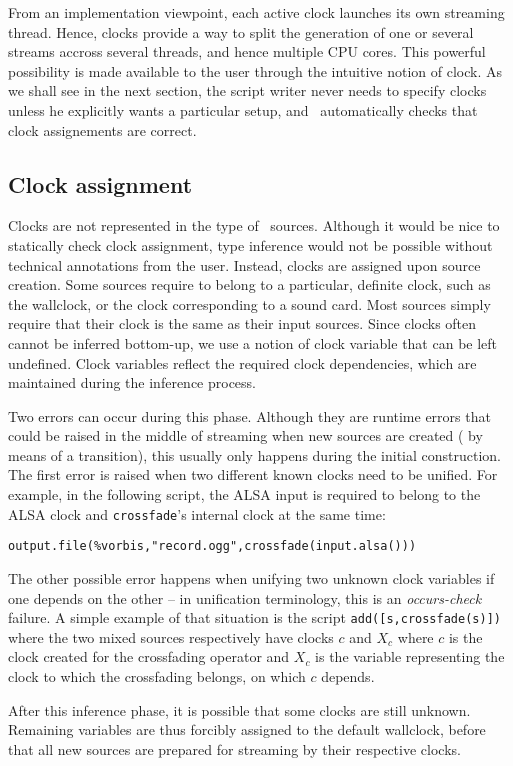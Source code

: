 From an implementation viewpoint, each active clock launches
its own streaming thread.
Hence, clocks provide a way to split the generation of one or
several streams accross several threads,
and hence multiple CPU cores.
This powerful possibility is made available to the user
through the intuitive notion of clock.
As we shall see in the next section,
the script writer never needs to specify clocks unless he
explicitly wants a particular setup,
and \liquidsoap\ automatically checks that clock assignements
are correct.


\subsection{Clock assignment}

Clocks are not represented in the type of \liquidsoap\ sources.
Although it would be nice to statically check clock assignment,
type inference would not be possible without technical annotations
from the user. Instead, clocks are assigned upon source creation.
Some sources require to belong to a particular, definite clock,
such as the wallclock, or the clock corresponding to a sound card.
Most sources simply require that their clock is the same as their
input sources.
Since clocks often cannot be inferred bottom-up, we use a notion
of clock variable that can be left undefined.
Clock variables reflect the required clock dependencies,
which are maintained during the inference process.

Two errors can occur during this phase.
Although they are runtime errors that could be raised
in the middle of streaming when new sources are created
(\eg{} by means of a transition),
this usually only happens during the initial construction.
The first error is raised when
two different known clocks need to be unified.
For example, in the following script, the ALSA input is
required to belong to the ALSA clock and \verb.crossfade.'s internal clock
at the same time:
\begin{verbatim}
output.file(%vorbis,"record.ogg",crossfade(input.alsa()))
\end{verbatim}
The other possible error happens when unifying two unknown clock variables
if one depends on the other -- in unification terminology, this is an
\emph{occurs-check} failure. A simple example of that situation is
the script \verb.add([s,crossfade(s)]). where the two mixed sources
respectively have clocks $c$ and $X_c$ where $c$ is the clock created
for the crossfading operator and $X_c$ is the variable representing
the clock to which the crossfading belongs, on which $c$ depends.

After this inference phase, it is possible that some clocks are still
unknown. Remaining variables are thus forcibly assigned to the default
wallclock, before that all new sources are prepared for streaming
by their respective clocks.
